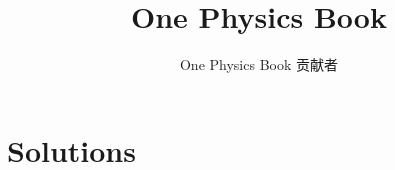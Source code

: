 \documentclass[11pt,a4paper,twoside,openany]{book}
\title{One Physics Book}
\author{One Physics Book 贡献者}
\date{\bookdate}
\begin{document}
\mainmatter
\setcounter{chapter}{10}

\appendix
\chapter{Solutions}

\end{document}
